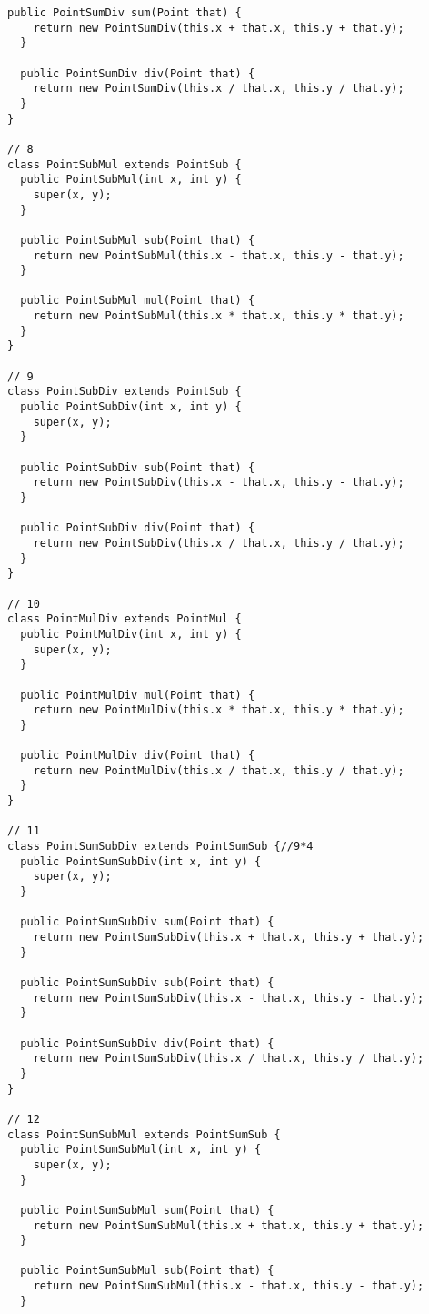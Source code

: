 \begin{lstlisting}[basicstyle=\tiny]
  public PointSumDiv sum(Point that) {
    return new PointSumDiv(this.x + that.x, this.y + that.y);
  }

  public PointSumDiv div(Point that) {
    return new PointSumDiv(this.x / that.x, this.y / that.y);
  }
}

// 8
class PointSubMul extends PointSub {
  public PointSubMul(int x, int y) {
    super(x, y);
  }

  public PointSubMul sub(Point that) {
    return new PointSubMul(this.x - that.x, this.y - that.y);
  }

  public PointSubMul mul(Point that) {
    return new PointSubMul(this.x * that.x, this.y * that.y);
  }
}

// 9
class PointSubDiv extends PointSub {
  public PointSubDiv(int x, int y) {
    super(x, y);
  }

  public PointSubDiv sub(Point that) {
    return new PointSubDiv(this.x - that.x, this.y - that.y);
  }

  public PointSubDiv div(Point that) {
    return new PointSubDiv(this.x / that.x, this.y / that.y);
  }
}

// 10
class PointMulDiv extends PointMul {
  public PointMulDiv(int x, int y) {
    super(x, y);
  }

  public PointMulDiv mul(Point that) {
    return new PointMulDiv(this.x * that.x, this.y * that.y);
  }

  public PointMulDiv div(Point that) {
    return new PointMulDiv(this.x / that.x, this.y / that.y);
  }
}

// 11
class PointSumSubDiv extends PointSumSub {//9*4
  public PointSumSubDiv(int x, int y) {
    super(x, y);
  }

  public PointSumSubDiv sum(Point that) {
    return new PointSumSubDiv(this.x + that.x, this.y + that.y);
  }

  public PointSumSubDiv sub(Point that) {
    return new PointSumSubDiv(this.x - that.x, this.y - that.y);
  }

  public PointSumSubDiv div(Point that) {
    return new PointSumSubDiv(this.x / that.x, this.y / that.y);
  }
}

// 12
class PointSumSubMul extends PointSumSub {
  public PointSumSubMul(int x, int y) {
    super(x, y);
  }

  public PointSumSubMul sum(Point that) {
    return new PointSumSubMul(this.x + that.x, this.y + that.y);
  }

  public PointSumSubMul sub(Point that) {
    return new PointSumSubMul(this.x - that.x, this.y - that.y);
  }


\end{lstlisting}

